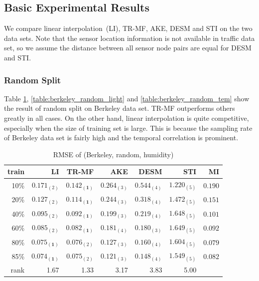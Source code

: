 \subsection{Basic Experimental Results} \label{subsec:exp_basic}%
We compare linear interpolation~(LI), TR-MF, AKE, DESM and STI on the two data sets. Note that the sensor location information is not available in traffic data set, so we assume the distance between all sensor node pairs are equal for DESM and STI.

\subsubsection{Random Split}
Table \ref{table:berkeley_random_hum}, \ref{table:berkeley_random_light} and \ref{table:berkeley_random_tem} show the result of random split on Berkeley data set. TR-MF outperforms others greatly in all cases. On the other hand, linear interpolation is quite competitive, especially when the size of training set is large. This is because the sampling rate of Berkeley data set is fairly high and the temporal correlation is prominent. 

\begin{table}[htbp]
\setlength{\tabcolsep}{2pt}
\centering
\caption{RMSE of (Berkeley, random, humidity)}
\label{table:berkeley_random_hum}
\begin{tabular}{ r | r r r r r r}
	train	&LI	&TR-MF	&AKE	&DESM	&STI &MI\\ \hline
	10\% & $ 0.171_{(2)} $ & $ \mathbf{ 0.142_{(1)} } $ & $ 0.264_{(3)} $ & $ 0.544_{(4)} $ & $ 1.220_{(5)} $&$0.190$ \\
	20\% & $ 0.127_{(2)} $ & $ \mathbf{ 0.114_{(1)} } $ & $ 0.244_{(3)} $ & $ 0.318_{(4)} $ & $ 1.472_{(5)} $ &$ 0.151$\\
	40\% & $ 0.095_{(2)} $ & $ \mathbf{ 0.092_{(1)} } $ & $ 0.199_{(3)} $ & $ 0.219_{(4)} $ & $ 1.648_{(5)} $ &$ 0.101$\\
	60\% & $ 0.085_{(2)} $ & $ \mathbf{ 0.082_{(1)} } $ & $ 0.181_{(4)} $ & $ 0.180_{(3)} $ & $ 1.649_{(5)} $ &$ 0.092$\\
	80\% & $ \mathbf{ 0.075_{(1)} } $ & $ 0.076_{(2)} $ & $ 0.127_{(3)} $ & $ 0.160_{(4)} $ & $ 1.604_{(5)} $ &$0.079$ \\
	85\% & $ \mathbf{ 0.074_{(1)} } $ & $ 0.075_{(2)} $ & $ 0.121_{(3)} $ & $ 0.148_{(4)} $ & $ 1.549_{(5)} $ &$0.082$ \\ \hline
	rank &1.67 &1.33 &3.17 &3.83 &5.00 \\
\end{tabular}
\end{table}

